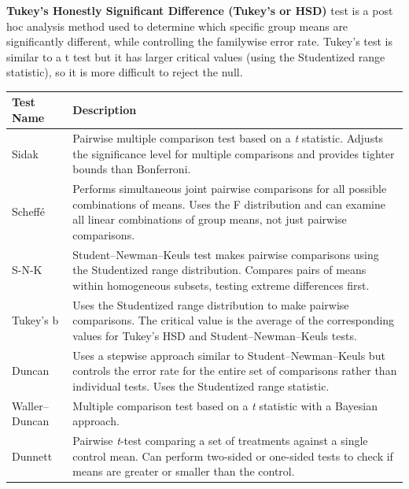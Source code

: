 \documentclass[
  letterpaper,
  DIV=11,
  numbers=noendperiod]{scrreprt}
\begin{document}
\textbf{Tukey's Honestly Significant Difference (Tukey's or HSD)} test
is a post hoc analysis method used to determine which specific group
means are significantly different, while controlling the familywise
error rate. Tukey's test is similar to a t test but it has larger
critical values (using the Studentized range statistic), so it is more
difficult to reject the null.

\begin{longtable}[]{@{}
  >{\raggedright\arraybackslash}p{}
  >{\raggedright\arraybackslash}p{}@{}}
\toprule\noalign{}
\begin{minipage}[b]{\linewidth}\raggedright
Test Name
\end{minipage} & \begin{minipage}[b]{\linewidth}\raggedright
Description
\end{minipage} \\
\midrule\noalign{}
\endhead
\bottomrule\noalign{}
\endlastfoot
Sidak & Pairwise multiple comparison test based on a \emph{t} statistic.
Adjusts the significance level for multiple comparisons and provides
tighter bounds than Bonferroni. \\
Scheffé & Performs simultaneous joint pairwise comparisons for all
possible combinations of means. Uses the F distribution and can examine
all linear combinations of group means, not just pairwise
comparisons. \\
S-N-K & Student--Newman--Keuls test makes pairwise comparisons using the
Studentized range distribution. Compares pairs of means within
homogeneous subsets, testing extreme differences first. \\
Tukey's b & Uses the Studentized range distribution to make pairwise
comparisons. The critical value is the average of the corresponding
values for Tukey's HSD and Student--Newman--Keuls tests. \\
Duncan & Uses a stepwise approach similar to Student--Newman--Keuls but
controls the error rate for the entire set of comparisons rather than
individual tests. Uses the Studentized range statistic. \\
Waller--Duncan & Multiple comparison test based on a \emph{t} statistic
with a Bayesian approach. \\
Dunnett & Pairwise \emph{t}-test comparing a set of treatments against a
single control mean. Can perform two-sided or one-sided tests to check
if means are greater or smaller than the control. \\
\end{longtable}
\end{document}
